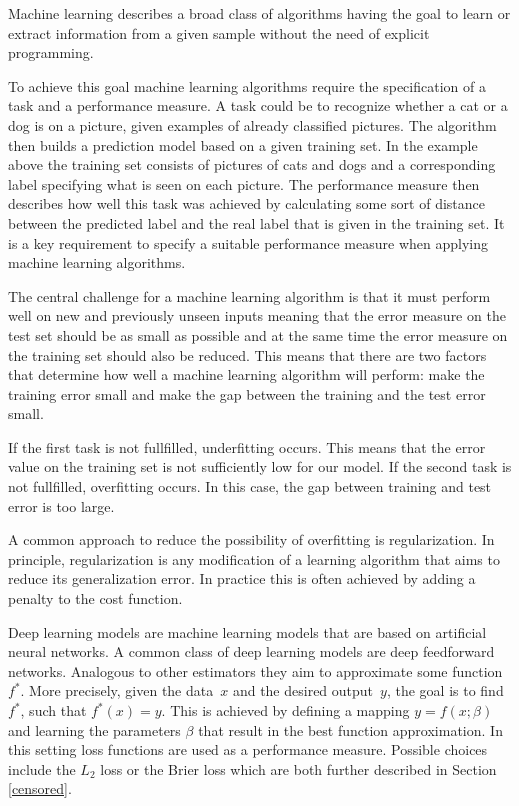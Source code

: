 \documentclass[12pt, a4paper]{scrartcl}
\theoremstyle{definition}
\theoremstyle{plain}
\numberwithin{equation}{section}
\numberwithin{figure}{section}
\numberwithin{table}{section}
\begin{document}
	Machine learning describes a broad class of algorithms having the goal to learn or extract information from a given sample without the need of explicit programming.
	
	To achieve this goal machine learning algorithms require the specification of a task and a performance measure.
	A task could be to recognize whether a cat or a dog is on a picture, given examples of already classified pictures.
	The algorithm then builds a prediction model based on a given training set.
	In the example above the training set consists of pictures of cats and dogs and a corresponding label specifying what is seen on each picture.
	The performance measure then describes how well this task was achieved by calculating some sort of distance between the predicted label and the real label that is given in the training set.
	It is a key requirement to specify a suitable performance measure when applying machine learning algorithms.
	

	The central challenge for a machine learning algorithm is that it must perform well on new and previously unseen inputs meaning that the error measure on the test set should be as small as possible and at the same time the error measure on the training set should also be reduced.
	This means that there are two factors that determine how well a machine learning algorithm will perform:
	make the training error small and make the gap between the training and the test error small.
	
	If the first task is not fullfilled, underfitting occurs. This means that the error value on the training set is not sufficiently low for our model.
	If the second task is not fullfilled, overfitting occurs. In this case, the gap between training and test error is too large.
	
	A common approach to reduce the possibility of overfitting is regularization.
	In principle, regularization is any modification of a learning algorithm that aims to reduce its generalization error.
	In practice this is often achieved by adding a penalty to the cost function.
	
	Deep learning models are machine learning models that are based on artificial neural networks.
	A common class of deep learning models are deep feedforward networks. Analogous to other estimators they aim to approximate some function~$f^*$.
	More precisely, given the data~$x$ and the desired output~$y$, the goal is to find $f^*$, such that $f^*(x)=y$.
	This is achieved by defining a mapping $y = f(x; \beta)$ and learning the parameters $\beta$ that result in the best function approximation.
	In this setting loss functions are used as a performance measure.
	Possible choices include the $L_2$ loss or the Brier loss which are both further described in Section \ref{censored}.
	
\end{document}
